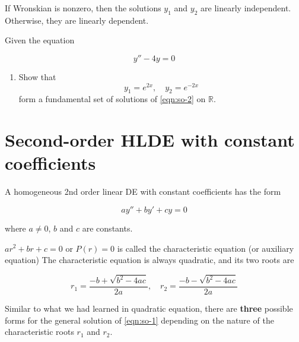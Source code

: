 \begin{remark}
    If Wronskian is nonzero, then the solutions $y_1$ and $y_2$ are linearly independent. 
    Otherwise, they are linearly dependent.
\end{remark}

\begin{example}
    Given the equation 

    \begin{equation}
        y'' - 4y = 0 \label{eqn:so-2}
    \end{equation}

    \begin{enumerate}
        \item Show that 
            \[
                y_1 = e^{2x}, \quad y_2 = e^{-2x}
            \]
            form a fundamental set of solutions of \eqref{eqn:so-2} on $\mathbb{R}$.
    \end{enumerate}
\end{example}

\section{Second-order HLDE with constant coefficients}

\begin{definition}
    A homogeneous 2nd order linear DE with constant coefficients has the form 

    \begin{equation}
        ay'' + by' + cy = 0 \label{eqn:so-1}
    \end{equation}

    where $a \neq 0$, $b$ and $c$ are constants.
\end{definition}

$ar^2 + br + c = 0$ or $P(r) = 0$ is called the characteristic equation (or auxiliary equation) 
The characteristic equation is always quadratic, and its two roots are

\begin{equation}
    r_1 = \frac{-b +\sqrt{b^2-4ac}}{2a}, \quad r_2 = \frac{-b -\sqrt{b^2-4ac}}{2a}
\end{equation}

Similar to what we had learned in quadratic equation, there are \textbf{three} possible forms 
for the general solution of \eqref{eqn:so-1} depending on the nature of the characteristic roots 
$r_1$ and $r_2$.

